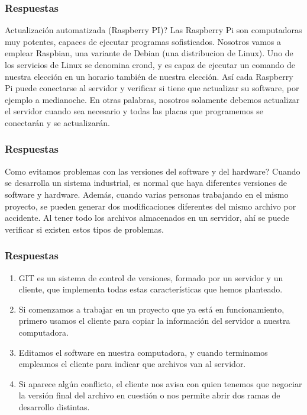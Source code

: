 \documentclass{beamer}
\begin{document}

\begin{frame}
\frametitle{Respuestas}
\begin{block}{\textquestiondown Actualización automatizada (Raspberry PI)?}
Las Raspberry Pi son computadoras muy potentes, capaces de ejecutar programas sofisticados. Nosotros vamos a emplear Raspbian, 
una variante de Debian (una distribucion de Linux). Uno de los servicios de Linux se denomina crond, y es capaz de ejecutar un comando de nuestra elecci\'{o}n en un horario también de nuestra elección. Así cada Raspberry Pi puede conectarse al servidor y verificar si tiene que actualizar su software, por ejemplo a medianoche. En otras palabras, nosotros solamente debemos actualizar el servidor cuando sea necesario y todas las placas que programemos se conectar\'{a}n y se actualizarán.
\end{block}
\end{frame}

\begin{frame}
\frametitle{Respuestas}
\begin{block}{\textquestiondown Como evitamos problemas con las versiones del software y del hardware?}
Cuando se desarrolla un sistema industrial, es normal que haya diferentes versiones de software y hardware.
Además, cuando varias personas trabajando en el mismo proyecto, se pueden generar dos modificaciones diferentes del mismo archivo por accidente. Al tener todo los archivos almacenados en un servidor, ahí se puede verificar si existen estos tipos de problemas.
\end{block}
\end{frame}

\begin{frame}
\frametitle{Respuestas}

\begin{enumerate}
\item GIT es un sistema de control de versiones, formado por un servidor y un cliente, que implementa todas estas características que hemos planteado.
\item Si comenzamos a trabajar en un proyecto que ya está en funcionamiento, primero usamos el cliente para copiar la información del servidor a nuestra computadora.
\item Editamos el software en nuestra computadora, y cuando terminamos empleamos el cliente para indicar que archivos van al servidor.
\item Si aparece alg\'{u}n conflicto, el cliente nos avisa con quien tenemos que negociar la versi\'{o}n final del archivo en cuesti\'{o}n o nos permite abrir dos ramas de desarrollo distintas.
\end{enumerate}

\end{frame}
\end{document}
